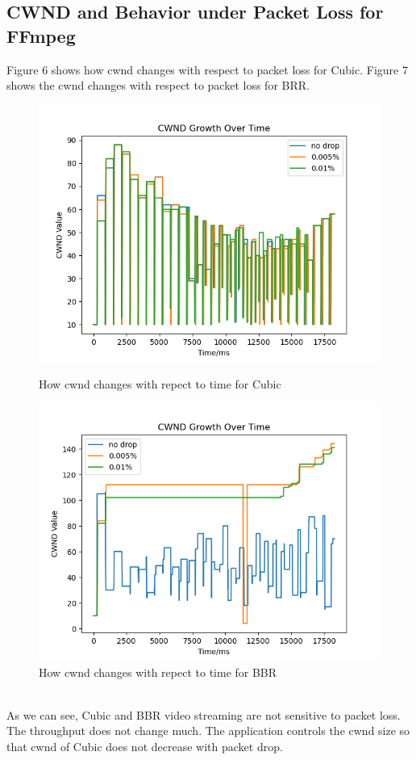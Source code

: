 \documentclass{article}
\begin{document}
\subsection{CWND and Behavior under Packet Loss for FFmpeg}
Figure 6 shows how cwnd changes with respect to packet loss for Cubic. Figure 7 shows the cwnd changes with respect to packet loss for BRR.
\begin{figure}[h]
    \begin{minipage}[b]{0.45\textwidth}
        \centering
        \includegraphics[width=\textwidth]{../figure/video_cubic_cwnd_drop.png}
        \caption{How cwnd changes with repect to time for Cubic}
        \label{fig:fig6}
    \end{minipage}
    \hfill
    \begin{minipage}[b]{0.45\textwidth}
        \centering
        \includegraphics[width=\textwidth]{../figure/video_BBR_cwnd_drop.png}
        \caption{How cwnd changes with repect to time for BBR}
        \label{fig:fig7}
    \end{minipage}
\end{figure}
\\[6pt]
As we can see, Cubic and BBR video streaming are not sensitive to packet loss. The throughput does not change much. The application controls the cwnd size so that cwnd of Cubic does not decrease with packet drop.
\end{document}
